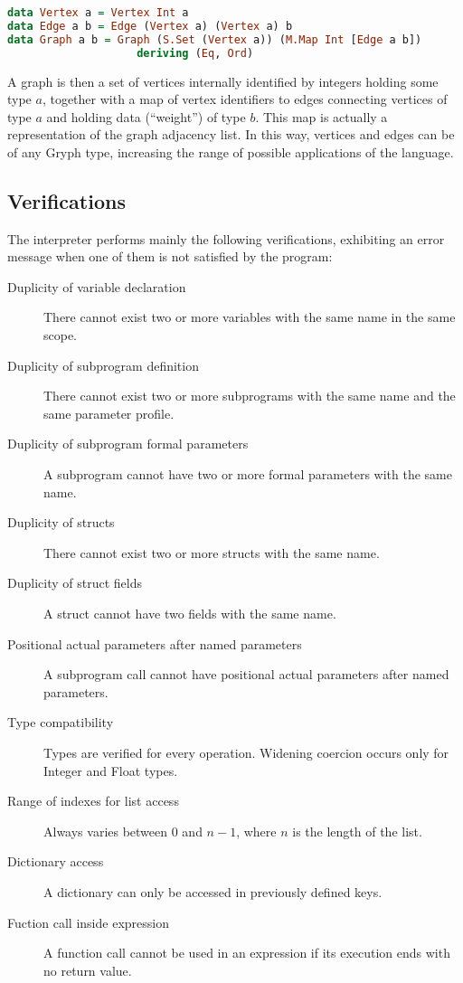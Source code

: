 \begin{lstlisting}[language=Haskell, basicstyle=\footnotesize]
data Vertex a = Vertex Int a
data Edge a b = Edge (Vertex a) (Vertex a) b
data Graph a b = Graph (S.Set (Vertex a)) (M.Map Int [Edge a b]) 
                    deriving (Eq, Ord)
\end{lstlisting}

A graph is then a set of vertices internally identified by integers holding some type $a$, together with
a map of vertex identifiers to edges connecting vertices of type $a$ and holding data (``weight'')
of type $b$. This map is actually a representation of the graph adjacency list. 
In this way, vertices and edges can be of any Gryph type, increasing the range of possible applications of the language.



\subsection{Verifications}

The interpreter performs mainly the following verifications, exhibiting
an error message when one of them is not satisfied by the
program:

\begin{description}
    \item[Duplicity of variable declaration] There cannot exist two or more
        variables with the same name in the same 
        scope.
    \item[Duplicity of subprogram definition] There cannot exist two
        or more subprograms with the same name and the same parameter
        profile.
    \item[Duplicity of subprogram formal parameters] A subprogram
        cannot have two or more formal parameters with the same name.
    \item[Duplicity of structs] There cannot exist two or more
        structs with the same name.
    \item[Duplicity of struct fields] A struct cannot have two fields
        with the same name.
    \item[Positional actual parameters after named parameters] A subprogram
        call cannot have positional actual parameters after named parameters.
    \item[Type compatibility] Types are verified for every operation.
        Widening coercion occurs only for Integer and Float types.
    \item[Range of indexes for list access] Always varies
        between 0 and $n-1$, where $n$ is the length of the list.
    \item[Dictionary access] A dictionary can only be accessed in
        previously defined keys.
    \item[Fuction call inside expression] A function call cannot
        be used in an expression if its execution ends with no
        return value.
\end{description}
